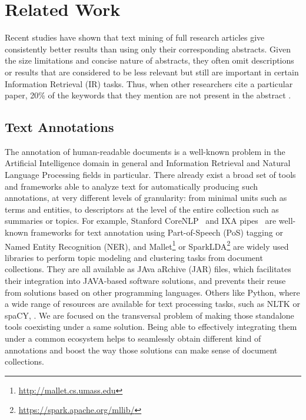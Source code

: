 

\chapter{Related Work}\label{ch:soa}

\graphicspath{{soa/figures/}}


Recent studies \cite{Westergaard2017}\cite{Sciences2016} have shown that text mining of full research articles give consistently better results than using only their corresponding abstracts. Given the size limitations and concise nature of abstracts, they often omit descriptions or results that are considered to be less relevant but still are important in certain Information Retrieval (IR) tasks. Thus, when other researchers cite a particular paper, 20\% of the keywords that they mention are not present in the abstract \cite{Divoli2012}.

\section{Text Annotations}

The annotation of human-readable documents is a well-known problem in the Artificial Intelligence domain in general and Information Retrieval and Natural Language Processing fields in particular. There already exist a broad set of tools and frameworks able to analyze text for automatically producing such annotations, at very different levels of granularity: from minimal units such as terms and entities, to descriptors at the level of the entire collection such as  summaries or topics. For example, Stanford CoreNLP~\cite{Manning2014TheToolkit} and IXA pipes~\cite{Agerri2014} are well-known frameworks for text annotation using Part-of-Speech (PoS) tagging or Named Entity Recognition (NER), and  Mallet\footnote{\url{http://mallet.cs.umass.edu}} or SparkLDA\footnote{\url{https://spark.apache.org/mllib/}} are widely used libraries to perform topic modeling and clustering tasks from document collections. They are all available as JAva aRchive (JAR) files, which facilitates their integration into JAVA-based software solutions, and prevents their reuse from solutions based on other programming languages.  Others like Python, where a wide range of resources are available for text processing tasks, such as NLTK or spaCY,  . We are focused on the transversal problem of making those standalone tools coexisting under a same solution. Being able to effectively integrating  them  under a common ecosystem helps to seamlessly obtain different kind of annotations and boost the way those solutions can make sense of document collections.  
 
